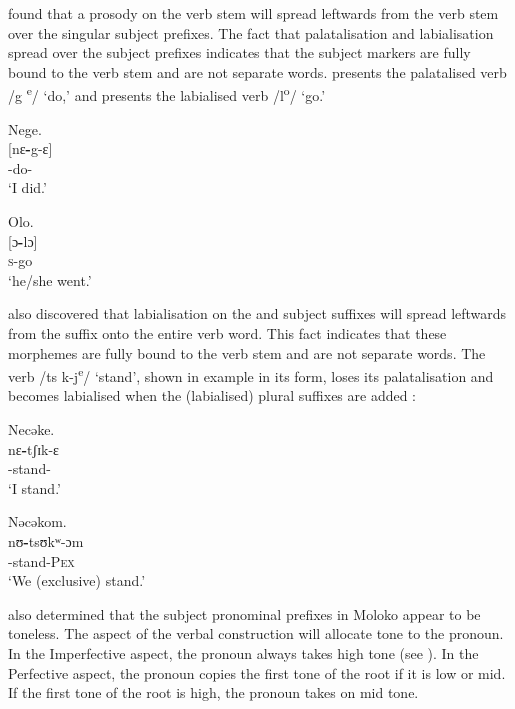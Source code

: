 \largerpage \citet{Bow1997c} found that a prosody on the verb stem will spread leftwards from the verb stem over the singular subject prefixes. The fact that palatalisation and labialisation spread over the subject prefixes indicates that the subject markers are fully bound to the verb stem and are not separate words.  presents the palatalised verb /g\textsuperscript{ e}/ ‘do,’ and  presents the labialised verb /l\textsuperscript{o}/ ‘go.’  

\ea\label{ex:7:11}
Nege.\\
\gll {}[nɛ\textbf{{}-}g-ɛ]\\
{\oneS}-do-{\CL}\\
\glt ‘I did.’
\z

\ea\label{ex:7:12}
Olo.\\
\gll {}[ɔ\textbf{{}-}lɔ]\\
\textsc{s}-go\\
\glt ‘he/she went.’
\z

\citet{Bow1997c} also discovered that labialisation on the {\oneP} and {\twoP} subject suffixes will spread leftwards from the suffix onto the entire verb word. This fact indicates that these morphemes are fully bound to the verb stem and are not separate words.  The verb /ts k-j\textsuperscript{e}/ ‘stand’, shown in example  in its {\oneS} form, loses its palatalisation and becomes labialised when the (labialised) plural suffixes are added :

\ea\label{ex:7:13}
Necəke.\\
\gll nɛ\textbf{{}-}tʃɪk-ɛ\\
{\oneS}-stand-{\CL}    \\
\glt ‘I stand.’
\z

\ea\label{ex:7:14}
Nəcəkom.    \\
\gll nʊ\textbf{{}-}tsʊkʷ{}-ɔm\\
{\oneS}-stand-\textsc{Pex}\\
\glt ‘We (exclusive) stand.’
\z

\citet{Bow1997c} also determined that the subject pronominal prefixes in Moloko appear to be toneless. The aspect of the verbal construction will allocate tone to the pronoun.   In the Imperfective aspect, the pronoun always takes high tone (see ).  In the Perfective aspect, the pronoun copies the first tone of the root if it is low or mid.  If the first tone of the root is high, the pronoun takes on mid tone.

